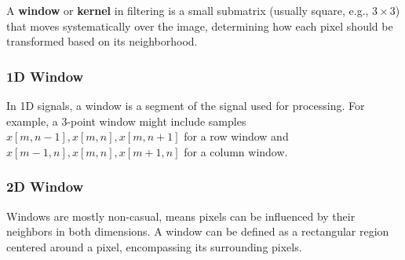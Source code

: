 A \textbf{window} or \textbf{kernel} in filtering is a small submatrix (usually square, e.g., $3 \times 3$) that moves systematically over the image, determining how each pixel should be transformed based on its neighborhood.

\subsubsection{1D Window}

In 1D signals, a window is a segment of the signal used for processing. For example, a $3$-point window might include samples $x[m, n-1], x[m, n], x[m, n+1]$ for a row window and $x[m-1, n], x[m, n], x[m+1, n]$ for a column window.

\begin{center}
\hspace{1cm}
\end{center}

\subsubsection{2D Window}

Windows are mostly non-casual, means pixels can be influenced by their neighbors in both dimensions. A window can be defined as a rectangular region centered around a pixel, encompassing its surrounding pixels. 

